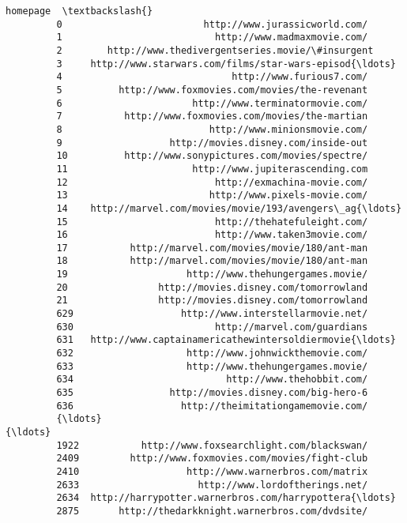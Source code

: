 \documentclass[11pt]{article}
\begin{document}
\begin{Verbatim}[commandchars=\\\{\}]
                                                        homepage  \textbackslash{}
         0                         http://www.jurassicworld.com/   
         1                           http://www.madmaxmovie.com/   
         2        http://www.thedivergentseries.movie/\#insurgent   
         3     http://www.starwars.com/films/star-wars-episod{\ldots}   
         4                              http://www.furious7.com/   
         5          http://www.foxmovies.com/movies/the-revenant   
         6                       http://www.terminatormovie.com/   
         7           http://www.foxmovies.com/movies/the-martian   
         8                          http://www.minionsmovie.com/   
         9                   http://movies.disney.com/inside-out   
         10          http://www.sonypictures.com/movies/spectre/   
         11                      http://www.jupiterascending.com   
         12                          http://exmachina-movie.com/   
         13                         http://www.pixels-movie.com/   
         14    http://marvel.com/movies/movie/193/avengers\_ag{\ldots}   
         15                          http://thehatefuleight.com/   
         16                          http://www.taken3movie.com/   
         17           http://marvel.com/movies/movie/180/ant-man   
         18           http://marvel.com/movies/movie/180/ant-man   
         19                     http://www.thehungergames.movie/   
         20                http://movies.disney.com/tomorrowland   
         21                http://movies.disney.com/tomorrowland   
         629                   http://www.interstellarmovie.net/   
         630                         http://marvel.com/guardians   
         631   http://www.captainamericathewintersoldiermovie{\ldots}   
         632                    http://www.johnwickthemovie.com/   
         633                    http://www.thehungergames.movie/   
         634                           http://www.thehobbit.com/   
         635                 http://movies.disney.com/big-hero-6   
         636                   http://theimitationgamemovie.com/   
         {\ldots}                                                 {\ldots}   
         1922           http://www.foxsearchlight.com/blackswan/   
         2409         http://www.foxmovies.com/movies/fight-club   
         2410                   http://www.warnerbros.com/matrix   
         2633                     http://www.lordoftherings.net/   
         2634  http://harrypotter.warnerbros.com/harrypottera{\ldots}   
         2875       http://thedarkknight.warnerbros.com/dvdsite/   

\end{Verbatim}
\end{document}
